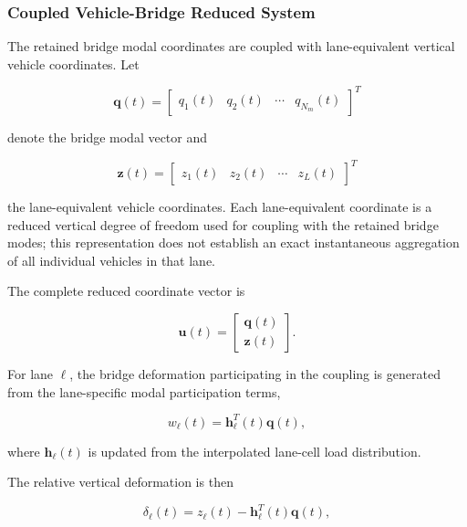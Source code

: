 \documentclass[journal]{IEEEtran}
\begin{document}
\subsubsection{Coupled Vehicle-Bridge Reduced System}

The retained bridge
modal coordinates are coupled with lane-equivalent vertical vehicle
coordinates. Let

\begin{equation}
\mathbf{q}(t)
=
\begin{bmatrix}
q_1(t) &
q_2(t) &
\cdots &
q_{N_m}(t)
\end{bmatrix}^{T}
\end{equation}

denote the bridge modal
vector and

\begin{equation}
\mathbf{z}(t)
=
\begin{bmatrix}
z_1(t) &
z_2(t) &
\cdots &
z_L(t)
\end{bmatrix}^{T}
\end{equation}

the lane-equivalent vehicle coordinates. Each lane-equivalent coordinate is a reduced vertical degree of freedom used for coupling with the retained bridge modes; this representation does not establish an exact instantaneous aggregation of all individual vehicles in that lane.

The complete reduced
coordinate vector is

\begin{equation}
\mathbf{u}(t)
=
\begin{bmatrix}
\mathbf{q}(t) \\
\mathbf{z}(t)
\end{bmatrix}.
\end{equation}

For lane $\ell$, the bridge
deformation participating in the coupling is generated from the lane-specific
modal participation terms,

\begin{equation}
w_{\ell}(t)
=
\mathbf{h}_{\ell}^{T}(t)
\mathbf{q}(t),
\end{equation}

where $\mathbf{h}_{\ell}(t)$ is updated from the
interpolated lane-cell load distribution.

The relative vertical
deformation is then

\begin{equation}
\delta_{\ell}(t)
=
z_{\ell}(t)
-
\mathbf{h}_{\ell}^{T}(t)
\mathbf{q}(t),
\end{equation}
\end{document}
